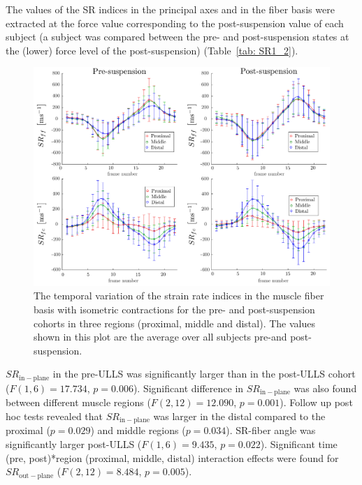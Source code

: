 The values of the SR indices in the principal axes and in the fiber basis were extracted at the force value corresponding to the post-suspension value of each subject (a subject was compared between the pre- and post-suspension states at the (lower) force level of the post-suspension) (Table~\ref{tab: SR1_2}).
\begin{figure}[!htb]
\vspace{+0.2cm}
\centering
\includegraphics[width=\textwidth]{Figures/ULLS_SRff.pdf}
\caption[The temporal variation of the strain rate indices in the muscle fiber basis with isometric contractions for the pre- and post-suspension cohorts in three regions]{The temporal variation of the strain rate indices in the muscle fiber basis with isometric contractions for the pre- and post-suspension cohorts in three regions (proximal, middle and distal). The values shown in this plot are the average over all subjects pre-and post-suspension.}
\label{fig: SR1_4}
\end{figure}
$SR_{\mathrm{in-plane}}$ in the pre-ULLS was significantly larger than in the post-ULLS cohort ($F(1, 6) = 17.734$, $p = 0.006$).
Significant difference in $SR_{\mathrm{in-plane}}$ was also found between different muscle regions ($F(2,12)=12.090$, $p = 0.001$). 
Follow up post hoc tests revealed that $SR_{\mathrm{in-plane}}$ was larger in the distal compared to the proximal ($p = 0.029$) and middle regions ($p = 0.034$). 
SR-fiber angle was significantly larger post-ULLS ($F(1,6) = 9.435$, $p = 0.022$).
Significant time (pre, post)*region (proximal, middle, distal) interaction effects were found for $SR_{\mathrm{out-plane}}$ ($F(2, 12) = 8.484$, $p=0.005$). 
